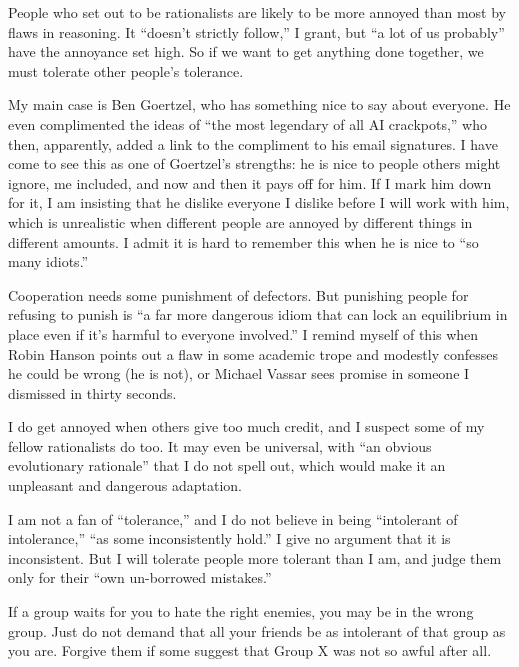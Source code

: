 
People who set out to be rationalists are likely to be more annoyed than most by flaws in reasoning. It ``doesn't strictly follow,'' I grant, but ``a lot of us probably'' have the annoyance set high. So if we want to get anything done together, we must tolerate other people's tolerance.

My main case is Ben Goertzel, who has something nice to say about everyone. He even complimented the ideas of ``the most legendary of all AI crackpots,'' who then, apparently, added a link to the compliment to his email signatures.  I have come to see this as one of Goertzel's strengths: he is nice to people others might ignore, me included, and now and then it pays off for him. If I mark him down for it, I am insisting that he dislike everyone I dislike before I will work with him, which is unrealistic when different people are annoyed by different things in different amounts. I admit it is hard to remember this when he is nice to ``so many idiots.''

Cooperation needs some punishment of defectors. But punishing people for refusing to punish is ``a far more dangerous idiom that can lock an equilibrium in place even if it's harmful to everyone involved.''  I remind myself of this when Robin Hanson points out a flaw in some academic trope and modestly confesses he could be wrong (he is not), or Michael Vassar sees promise in someone I dismissed in thirty seconds.

I do get annoyed when others give too much credit, and I suspect some of my fellow rationalists do too. It may even be universal, with ``an obvious evolutionary rationale'' that I do not spell out, which would make it an unpleasant and dangerous adaptation.

I am not a fan of ``tolerance,'' and I do not believe in being ``intolerant of intolerance,'' ``as some inconsistently hold.'' I give no argument that it is inconsistent.  But I will tolerate people more tolerant than I am, and judge them only for their ``own un-borrowed mistakes.''

If a group waits for you to hate the right enemies, you may be in the wrong group. Just do not demand that all your friends be as intolerant of that group as you are. Forgive them if some suggest that Group X was not so awful after all.
